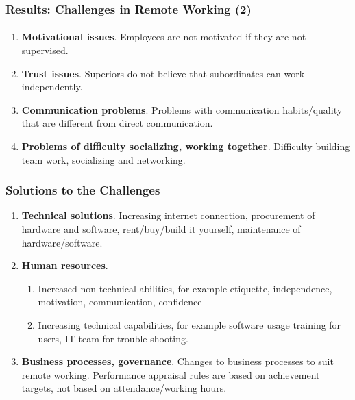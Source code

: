 \documentclass[aspectratio=169, table]{beamer}
\begin{document}
    \begin{frame}
        \frametitle{Results: Challenges in Remote Working (2)}
        \framesubtitle{\hspace{1cm}}
        \begin{enumerate}

            \item \textbf{Motivational issues}. Employees are not motivated if they are not supervised.
            \item \textbf{Trust issues}. Superiors do not believe that subordinates can work independently.
            \item \textbf{Communication problems}. Problems with communication habits/quality that are different from direct communication.
            \item \textbf{Problems of difficulty socializing, working together}. Difficulty building team work, socializing and networking.
        \end{enumerate}
    \end{frame}

    \begin{frame}
        \frametitle{Solutions to the Challenges}
        \begin{enumerate}
            \item \textbf{Technical solutions}. Increasing internet connection, procurement of hardware and software, rent/buy/build it yourself, maintenance of hardware/software.
            \item \textbf{Human resources}.
            \begin{enumerate}
                \item Increased non-technical abilities, for example etiquette, independence, motivation, communication, confidence
                \item Increasing technical capabilities, for example software usage training for users, IT team for trouble shooting.
            \end{enumerate}
            \item \textbf{Business processes, governance}. Changes to business processes to suit remote working. Performance appraisal rules are based on achievement targets, not based on attendance/working hours.
        \end{enumerate}
    \end{frame}
\end{document}
